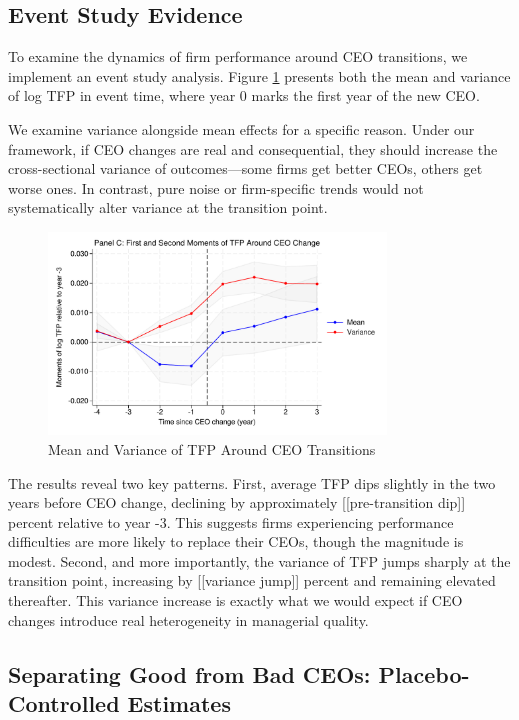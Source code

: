 \documentclass[11pt,a4paper]{article}
\begin{document}
\subsection{Event Study Evidence}

To examine the dynamics of firm performance around CEO transitions, we implement an event study analysis. Figure \ref{fig:event_study_combined} presents both the mean and variance of log TFP in event time, where year 0 marks the first year of the new CEO.

We examine variance alongside mean effects for a specific reason. Under our framework, if CEO changes are real and consequential, they should increase the cross-sectional variance of outcomes—some firms get better CEOs, others get worse ones. In contrast, pure noise or firm-specific trends would not systematically alter variance at the transition point.

\begin{figure}[htbp]
\centering
\includegraphics[width=0.8\textwidth]{figure/event_study_panel_c.pdf}
\caption{Mean and Variance of TFP Around CEO Transitions}
\label{fig:event_study_combined}
\end{figure}

The results reveal two key patterns. First, average TFP dips slightly in the two years before CEO change, declining by approximately [[pre-transition dip]] percent relative to year -3. This suggests firms experiencing performance difficulties are more likely to replace their CEOs, though the magnitude is modest. Second, and more importantly, the variance of TFP jumps sharply at the transition point, increasing by [[variance jump]] percent and remaining elevated thereafter. This variance increase is exactly what we would expect if CEO changes introduce real heterogeneity in managerial quality.

\subsection{Separating Good from Bad CEOs: Placebo-Controlled Estimates}
\end{document}
